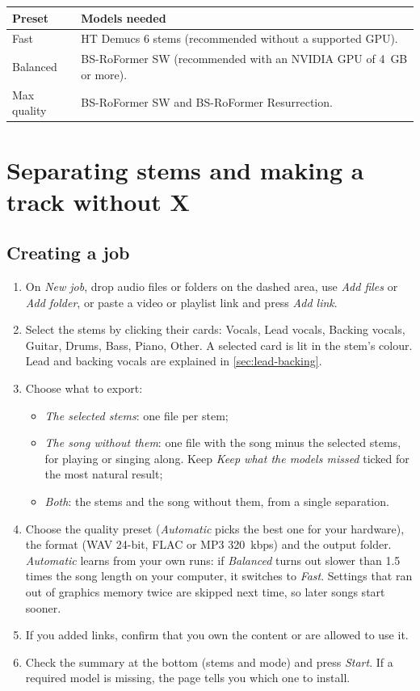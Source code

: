 \documentclass{covermaker}
\begin{document}
\begin{tabularx}{\linewidth}{@{}lY@{}}
\toprule
\textbf{Preset} & \textbf{Models needed} \\
\midrule
Fast & HT Demucs 6 stems (recommended without a supported GPU). \\
Balanced & BS-RoFormer SW (recommended with an NVIDIA GPU of 4~GB or more). \\
Max quality & BS-RoFormer SW and BS-RoFormer Resurrection. \\
\bottomrule
\end{tabularx}

\chapter{Separating stems and making a track without X}
\section{Creating a job}
\begin{enumerate}
  \item On \emph{New job}, drop audio files or folders on the dashed area, use
        \emph{Add files} or \emph{Add folder}, or paste a video or playlist link
        and press \emph{Add link}.
  \item Select the stems by clicking their cards: Vocals, Lead vocals,
        Backing vocals, Guitar, Drums, Bass, Piano, Other. A selected card is
        lit in the stem's colour. Lead and backing vocals are explained in
        \autoref{sec:lead-backing}.
  \item Choose what to export:
        \begin{itemize}
          \item \emph{The selected stems}: one file per stem;
          \item \emph{The song without them}: one file with the song minus the
                selected stems, for playing or singing along. Keep \emph{Keep
                what the models missed} ticked for the most natural result;
          \item \emph{Both}: the stems and the song without them, from a single
                separation.
        \end{itemize}
  \item Choose the quality preset (\emph{Automatic} picks the best one for your
        hardware), the format (WAV 24-bit, FLAC or MP3 320~kbps) and the output
        folder. \emph{Automatic} learns from your own runs: if \emph{Balanced}
        turns out slower than 1.5 times the song length on your computer, it
        switches to \emph{Fast}. Settings that ran out of graphics memory twice
        are skipped next time, so later songs start sooner.
  \item If you added links, confirm that you own the content or are allowed to
        use it.
  \item Check the summary at the bottom (stems and mode) and press
        \emph{Start}. If a required model is missing, the page tells you
        which one to install.
\end{enumerate}
\end{document}
